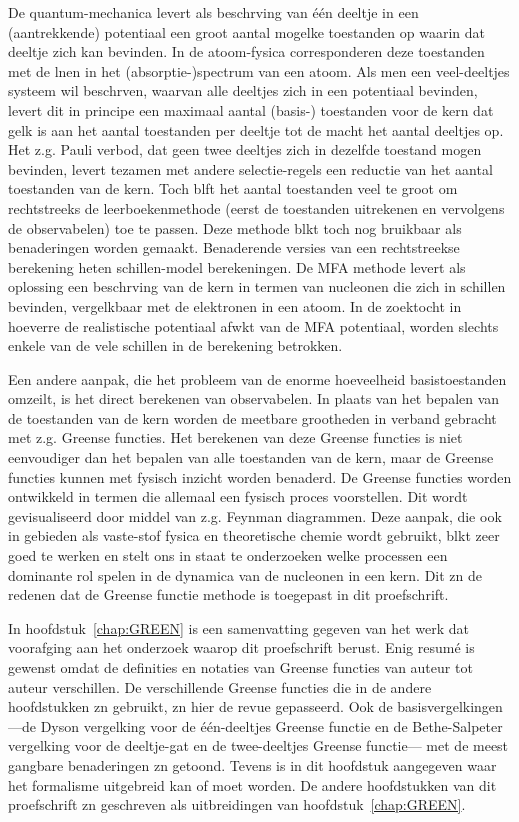 De quantum-mechanica levert als beschr{\ij}ving van \'e\'en deeltje in een 
(aantrekkende) potentiaal een groot aantal mogel{\ij}ke toestanden op 
waarin dat deeltje
zich kan bevinden. In de atoom-fysica corresponderen deze toestanden  met de
l{\ij}nen in het (absorptie-)spectrum van een atoom. 
Als men een veel-deeltjes systeem wil beschr{\ij}ven, waarvan alle deeltjes
 zich in een potentiaal
bevinden, levert dit in principe een maximaal aantal (basis-) toestanden voor 
de 
kern dat gel{\ij}k is aan
het aantal toestanden per deeltje tot de macht het aantal deeltjes op. Het z.g.
Pauli verbod, dat geen twee deeltjes zich in dezelfde toestand mogen bevinden,
levert tezamen met andere selectie-regels een reductie van het aantal 
toestanden van de kern. Toch bl{\ij}ft het aantal toestanden veel te 
groot om rechtstreeks de leerboekenmethode (eerst de toestanden uitrekenen en 
vervolgens de observabelen) toe te passen. Deze methode bl{\ij}kt toch nog 
bruikbaar als benaderingen worden gemaakt.
Benaderende versies van een rechtstreekse berekening heten schillen-model 
berekeningen. De MFA methode levert als oplossing een beschr{\ij}ving van de 
kern in termen van nucleonen die zich in schillen bevinden, 
vergel{\ij}kbaar met 
de elektronen in een atoom. In de zoektocht in hoeverre de realistische 
potentiaal afw{\ij}kt van de MFA potentiaal, worden slechts enkele van de vele 
schillen in de berekening betrokken.

Een andere aanpak, die het probleem van de enorme hoeveelheid basistoestanden 
omzeilt, is het direct berekenen van 
observabelen. In plaats van het bepalen van  de toestanden van de kern
worden de meetbare grootheden in verband gebracht met z.g. Greense functies.
Het berekenen van deze Greense functies is niet eenvoudiger dan het bepalen
van alle toestanden van de kern, maar de Greense functies kunnen 
met fysisch inzicht worden benaderd. De Greense functies worden ontwikkeld
in termen die allemaal een fysisch proces voorstellen. Dit wordt 
gevisualiseerd
door middel van z.g. Feynman diagrammen. 
Deze aanpak, die ook in gebieden als vaste-stof fysica en theoretische chemie
wordt gebruikt, bl{\ij}kt zeer goed te werken en stelt ons in staat te onderzoeken
welke processen een dominante rol spelen in de dynamica van de nucleonen in
een kern. 
Dit z{\ij}n de redenen dat de Greense functie methode is toegepast in dit 
proefschrift.

In hoofdstuk~\ref{chap:GREEN} is een samenvatting gegeven van het werk
dat voorafging aan het onderzoek waarop dit proefschrift berust. Enig resum\'e
is gewenst omdat de definities en notaties van Greense functies van auteur tot 
auteur verschillen. De verschillende Greense functies die in de andere 
hoofdstukken z{\ij}n gebruikt, z{\ij}n hier de revue gepasseerd. Ook de 
basisvergel{\ij}kingen 
---de Dyson vergel{\ij}king voor de \'e\'en-deeltjes
Greense functie en de Bethe-Salpeter vergel{\ij}king voor de deeltje-gat en de 
twee-deeltjes Greense functie--- met de meest gangbare benaderingen z{\ij}n
getoond.
Tevens is in dit hoofdstuk aangegeven waar het formalisme
uitgebreid kan of moet worden. De andere hoofdstukken van dit proefschrift 
z{\ij}n geschreven als uitbreidingen van hoofdstuk~\ref{chap:GREEN}.

